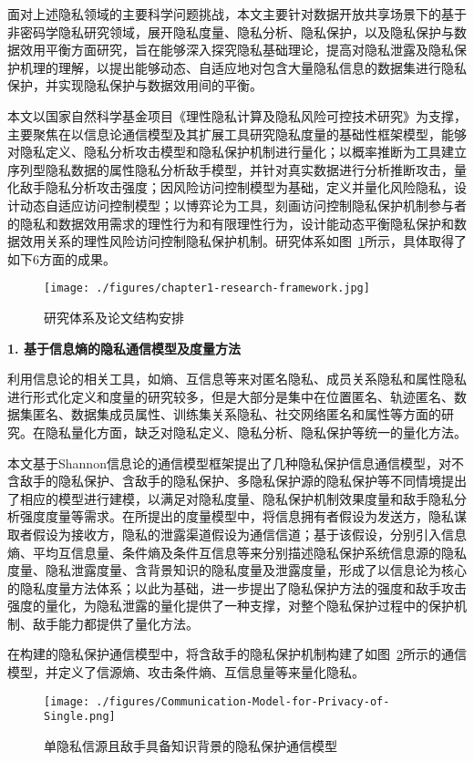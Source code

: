 \documentclass[pdftex,notypeinfo,twoside,openany,UTF8,fntef]{CASthesis}
\theoremstyle{THrm}{
	\newtheorem{question}{Question}[section]
	\newtheorem{property}{性质}[section]
	\newtheorem{assumption}{假设}[section]
	\newtheorem{claim}[lemma]{断言}
	
}
\begin{document}
面对上述隐私领域的主要科学问题挑战，本文主要针对数据开放共享场景下的基于非密码学隐私研究领域，展开隐私度量、隐私分析、隐私保护，以及隐私保护与数据效用平衡方面研究，旨在能够深入探究隐私基础理论，提高对隐私泄露及隐私保护机理的理解，以提出能够动态、自适应地对包含大量隐私信息的数据集进行隐私保护，并实现隐私保护与数据效用间的平衡。

本文以国家自然科学基金项目《理性隐私计算及隐私风险可控技术研究》为支撑，主要聚焦在以信息论通信模型及其扩展工具研究隐私度量的基础性框架模型，能够对隐私定义、隐私分析攻击模型和隐私保护机制进行量化；以概率推断为工具建立序列型隐私数据的属性隐私分析敌手模型，并针对真实数据进行分析推断攻击，量化敌手隐私分析攻击强度；因风险访问控制模型为基础，定义并量化风险隐私，设计动态自适应访问控制模型；以博弈论为工具，刻画访问控制隐私保护机制参与者的隐私和数据效用需求的理性行为和有限理性行为，设计能动态平衡隐私保护和数据效用关系的理性风险访问控制隐私保护机制。研究体系如图~\ref{fig:chapter1-research-framework}所示，具体取得了如下6方面的成果。

\begin{figure}[htbp]
	\centering
	\texttt{[image: ./figures/chapter1-research-framework.jpg]}
	\caption{研究体系及论文结构安排}
	\label{fig:chapter1-research-framework}
\end{figure}

\textbf{1.	基于信息熵的隐私通信模型及度量方法}

利用信息论的相关工具，如熵、互信息等来对匿名隐私、成员关系隐私和属性隐私进行形式化定义和度量的研究较多，但是大部分是集中在位置匿名、轨迹匿名、数据集匿名、数据集成员属性、训练集关系隐私、社交网络匿名和属性等方面的研究。在隐私量化方面，缺乏对隐私定义、隐私分析、隐私保护等统一的量化方法。

本文基于Shannon信息论的通信模型框架提出了几种隐私保护信息通信模型，对不含敌手的隐私保护、含敌手的隐私保护、多隐私保护源的隐私保护等不同情境提出了相应的模型进行建模，以满足对隐私度量、隐私保护机制效果度量和敌手隐私分析强度度量等需求。在所提出的度量模型中，将信息拥有者假设为发送方，隐私谋取者假设为接收方，隐私的泄露渠道假设为通信信道；基于该假设，分别引入信息熵、平均互信息量、条件熵及条件互信息等来分别描述隐私保护系统信息源的隐私度量、隐私泄露度量、含背景知识的隐私度量及泄露度量，形成了以信息论为核心的隐私度量方法体系；以此为基础，进一步提出了隐私保护方法的强度和敌手攻击强度的量化，为隐私泄露的量化提供了一种支撑，对整个隐私保护过程中的保护机制、敌手能力都提供了量化方法。

在构建的隐私保护通信模型中，将含敌手的隐私保护机制构建了如图~\ref{fig:Communication-Model-for-Privacy-of-Single}所示的通信模型，并定义了信源熵、攻击条件熵、互信息量等来量化隐私。
\begin{figure}[htbp]
	\centering
	\texttt{[image: ./figures/Communication-Model-for-Privacy-of-Single.png]}
	\caption{单隐私信源且敌手具备知识背景的隐私保护通信模型}
	\label{fig:Communication-Model-for-Privacy-of-Single}
\end{figure}
\end{document}

